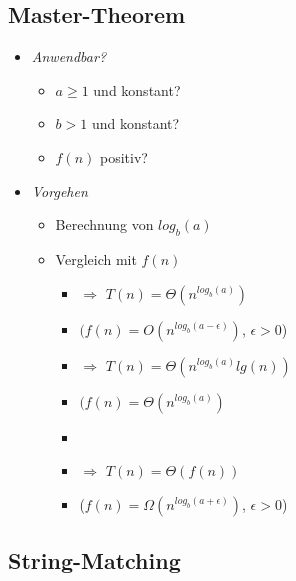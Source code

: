 \subsection*{Master-Theorem}
\begin{itemize}
    \item \textit{Anwendbar?}
        \begin{itemize}
            \item $a \geq 1$ und konstant?
            \item $b > 1$ und konstant?
            \item $f(n)$ positiv?
        \end{itemize}
    \item \textit{Vorgehen}
        \begin{itemize}
            \item Berechnung von $log_b(a)$
            \item Vergleich mit $f(n)$
                \begin{itemize}
                    \item {}  $\Rightarrow$ $T(n) = \Theta(n^{log_b(a)})$
                    \item[] $(f(n) = O(n^{log_b(a-\epsilon)})$, $\epsilon > 0$)
                    \item {}  $\Rightarrow$ $T(n) = \Theta(n^{log_b(a)} lg(n))$
                    \item[] $(f(n) = \Theta(n^{log_b(a)})$
                    \item {} 
                    \item[] {}  $\Rightarrow$ $T(n) = \Theta(f(n))$
                    \item[] ($f(n) = \Omega (n^{log_b(a + \epsilon)})$, $\epsilon > 0$) 
                \end{itemize}
        \end{itemize}
\end{itemize}

\subsection*{String-Matching}
